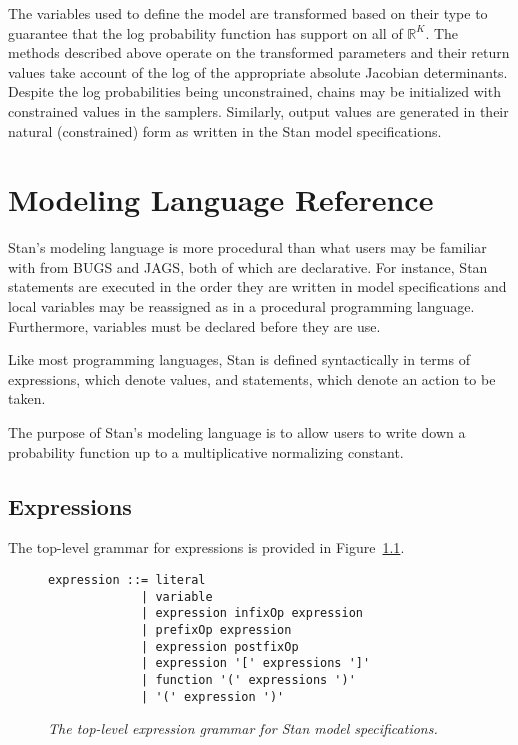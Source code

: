 \documentclass[10pt]{report}
\newcommand{\Stan}{Stan\xspace}
\newcommand{\mycaption}[2]{\caption{{\it #2}\label{#1.figure}}}
\newcommand{\reffigure}[1]{Figure~\ref{#1.figure}}
\begin{document}
The variables used to define the model are transformed based on their
type to guarantee that the log probability function has support on all
of $\mathbb{R}^K$.  The methods described above operate on the
transformed parameters and their return values take account of the log
of the appropriate absolute Jacobian determinants.  Despite the log
probabilities being unconstrained, chains may be initialized with
constrained values in the samplers.  Similarly, output values are
generated in their natural (constrained) form as written in the
\Stan model specifications.





\chapter{Modeling Language Reference}

\Stan's modeling language is more procedural than what users may be
familiar with from BUGS and JAGS, both of which are declarative.  For
instance, \Stan statements are executed in the order they are written
in model specifications and local variables may be reassigned as in a
procedural programming language.  Furthermore, variables must be
declared before they are use.  

Like most programming languages, \Stan is defined syntactically in
terms of expressions, which denote values, and statements, which
denote an action to be taken.

The purpose of \Stan's modeling language is to allow users to write
down a probability function up to a multiplicative normalizing
constant.  


\section{Expressions}

The top-level grammar for expressions is provided in
\reffigure{expression-grammar}.

\begin{figure}
\begin{center}
{%
\begin{Verbatim}
expression ::= literal
             | variable
             | expression infixOp expression
             | prefixOp expression
             | expression postfixOp
             | expression '[' expressions ']'
             | function '(' expressions ')'
             | '(' expression ')'
\end{Verbatim}
}
\end{center}
\mycaption{expression-grammar}
          {The top-level expression grammar for \Stan model specifications.}
\end{figure}
\end{document}
